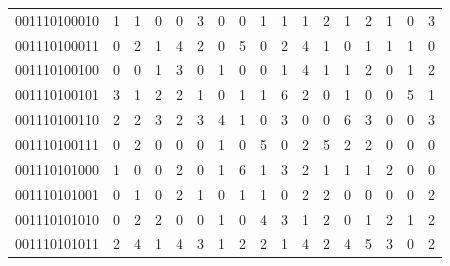 \documentclass[10pt,a4paper]{article}
\begin{document}
\begin{longtable}{ |c|c|c|c|c|c|c|c|c|c|c|c|c|c|c|c|c| }
    001110100010              & 1                            & 1                                & 0                            & 0                              & 3   & 0   & 0   & 1   & 1   & 1   & 2   & 1   & 2   & 1   & 0   & 3   \\
    001110100011              & 0                            & 2                                & 1                            & 4                              & 2   & 0   & 5   & 0   & 2   & 4   & 1   & 0   & 1   & 1   & 1   & 0   \\
    001110100100              & 0                            & 0                                & 1                            & 3                              & 0   & 1   & 0   & 0   & 1   & 4   & 1   & 1   & 2   & 0   & 1   & 2   \\
    001110100101              & 3                            & 1                                & 2                            & 2                              & 1   & 0   & 1   & 1   & 6   & 2   & 0   & 1   & 0   & 0   & 5   & 1   \\
    001110100110              & 2                            & 2                                & 3                            & 2                              & 3   & 4   & 1   & 0   & 3   & 0   & 0   & 6   & 3   & 0   & 0   & 3   \\
    001110100111              & 0                            & 2                                & 0                            & 0                              & 0   & 1   & 0   & 5   & 0   & 2   & 5   & 2   & 2   & 0   & 0   & 0   \\
    001110101000              & 1                            & 0                                & 0                            & 2                              & 0   & 1   & 6   & 1   & 3   & 2   & 1   & 1   & 1   & 2   & 0   & 0   \\
    001110101001              & 0                            & 1                                & 0                            & 2                              & 1   & 0   & 1   & 1   & 0   & 2   & 2   & 0   & 0   & 0   & 0   & 2   \\
    001110101010              & 0                            & 2                                & 2                            & 0                              & 0   & 1   & 0   & 4   & 3   & 1   & 2   & 0   & 1   & 2   & 1   & 2   \\
    001110101011              & 2                            & 4                                & 1                            & 4                              & 3   & 1   & 2   & 2   & 1   & 4   & 2   & 4   & 5   & 3   & 0   & 2   \\

\end{longtable}
\end{document}
